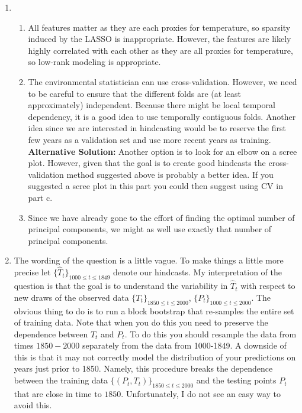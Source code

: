 \begin{enumerate}
\item \begin{enumerate}
\item All features matter as they are each proxies for temperature, so sparsity induced by the LASSO is inappropriate. However, the features are likely highly correlated with each other as they are all proxies for temperature, so low-rank modeling is appropriate.

\item The environmental statistician can use cross-validation. However, we need to be careful to ensure that the different folds are (at least approximately) independent. Because there might be local temporal dependency, it is a good idea to use temporally contiguous folds. Another idea since we are interested in hindcasting would be to reserve the first few years as a validation set and use more recent years as training. \\

\textbf{Alternative Solution:} Another option is to look for an elbow on a scree plot. However, given that the goal is to create good hindcasts the cross-validation method suggested above is probably a better idea. If you suggested a scree plot in this part you could then suggest using CV in part c.

\item Since we have already gone to the effort of finding the optimal number of principal components, we might as well use exactly that number of principal components.

\end{enumerate}

\item The wording of the question is a little vague. To make things a little more precise let $\{\hat{T}_t\}_{1000 \leq t \leq 1849}$ denote our hindcasts. My interpretation of the question is that the goal is to understand the variability in $\hat{T}_t$ with respect to new draws of the observed data $\{T_t\}_{1850 \leq t \leq 2000}$, $\{P_t\}_{1000 \leq t \leq 2000}$. The obvious thing to do is to run a block bootstrap that re-samples the entire set of training data. Note that when you do this you need to preserve the dependence between $T_t$ and $P_t$. To do this you should resample the data from times $1850-2000$ separately from the data from 1000-1849. A downside of this is that it may not correctly model the distribution of your predictions on years just prior to 1850. Namely, this procedure breaks the dependence between the training data  $\{(P_t,T_t)\}_{1850 \leq t \leq 2000}$ and the testing points $P_t$ that are close in time to $1850$. Unfortunately, I do not see an easy way to avoid this.


\end{enumerate}
